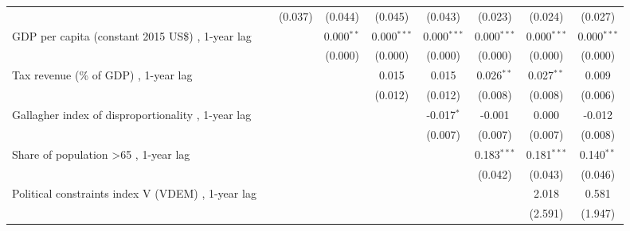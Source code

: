 \begin{table}[htbp]
\begin{tabular}{lcccccccc}
                                                                                  &                & (0.037)       & (0.044)        & (0.045)        & (0.043)        & (0.023)        & (0.024)        & (0.027)\\   
      GDP per capita (constant 2015 US\$) , 1-year lag                            &                &               & 0.000$^{**}$   & 0.000$^{***}$  & 0.000$^{***}$  & 0.000$^{***}$  & 0.000$^{***}$  & 0.000$^{***}$\\   
                                                                                  &                &               & (0.000)        & (0.000)        & (0.000)        & (0.000)        & (0.000)        & (0.000)\\   
      Tax revenue (\% of GDP) , 1-year lag                                        &                &               &                & 0.015          & 0.015          & 0.026$^{**}$   & 0.027$^{**}$   & 0.009\\   
                                                                                  &                &               &                & (0.012)        & (0.012)        & (0.008)        & (0.008)        & (0.006)\\   
      Gallagher index of disproportionality , 1-year lag                          &                &               &                &                & -0.017$^{*}$   & -0.001         & 0.000          & -0.012\\   
                                                                                  &                &               &                &                & (0.007)        & (0.007)        & (0.007)        & (0.008)\\   
      Share of population >65 , 1-year lag                                        &                &               &                &                &                & 0.183$^{***}$  & 0.181$^{***}$  & 0.140$^{**}$\\   
                                                                                  &                &               &                &                &                & (0.042)        & (0.043)        & (0.046)\\   
      Political constraints index V (VDEM) , 1-year lag                           &                &               &                &                &                &                & 2.018          & 0.581\\   
                                                                                  &                &               &                &                &                &                & (2.591)        & (1.947)\\   

\end{tabular}
\end{table}
